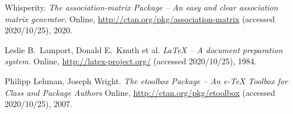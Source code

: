 \documentclass{article}
\begin{document}
\begin{thebibliography}{3}
Whisperity. \textit{The \textsf{association-matrix} Package -- An easy and clear association matrix generator}.
Online, \url{http://ctan.org/pkg/association-matrix} (accessed 2020/10/25), 2020.

Leslie B.\ Lamport, Donald E.\ Knuth et al. 
\textit{\LaTeX{} -- A document preparation system}. 
Online, \url{http://latex-project.org/} (accessed 2020/10/25), 1984.

Philipp Lehman, Joseph Wright.
\textit{The \textsf{etoolbox} Package -- An e-\TeX{} Toolbox for Class and Package Authors}
Online, \url{http://ctan.org/pkg/etoolbox} (accessed 2020/10/25), 2007.
\end{thebibliography}
\end{document}
